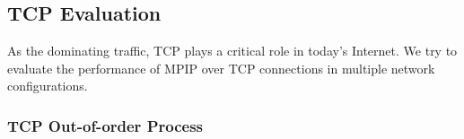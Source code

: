 \begin{figure}
\caption{}
\label{fig.clockandoutoforder}
\end{figure}


\subsection{TCP Evaluation}
\label{sec:tcp}

As the dominating traffic, TCP plays a critical role in today's Internet. We try to evaluate the performance of MPIP over TCP connections in multiple network configurations. 

\subsubsection{TCP Out-of-order Process}
\label{sec:outoforder}

